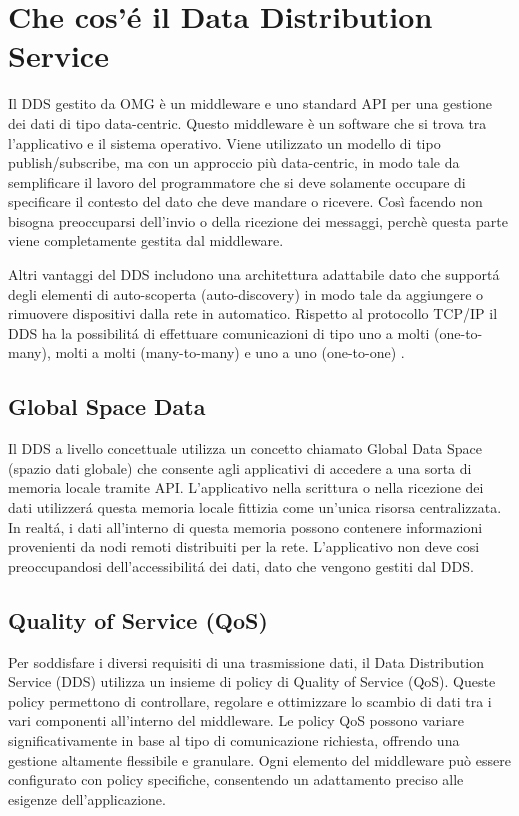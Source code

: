 \section{Che cos'é il Data Distribution Service}

Il DDS gestito da OMG è un middleware e uno standard API per una gestione
dei dati di tipo data-centric. Questo middleware è un software che si trova
tra l'applicativo e il sistema operativo. Viene utilizzato un modello
di tipo publish/subscribe, ma con un approccio più data-centric, in modo
tale da semplificare il lavoro del programmatore che si deve solamente
occupare di specificare il contesto del dato che deve mandare o ricevere.
Così facendo non bisogna preoccuparsi dell'invio o della ricezione
dei messaggi, perchè questa parte viene completamente gestita dal middleware.

Altri vantaggi del DDS includono una architettura adattabile dato che supportá
degli elementi di auto-scoperta (auto-discovery) in modo tale da aggiungere o 
rimuovere dispositivi dalla rete in automatico. Rispetto al protocollo TCP/IP 
il DDS ha la possibilitá di effettuare comunicazioni di tipo uno a molti 
(one-to-many), molti a molti (many-to-many) e uno a uno (one-to-one)
 \cite{1494965}.

\subsection{Global Space Data}
Il DDS a livello concettuale utilizza un concetto chiamato Global Data 
Space (spazio dati globale) che consente agli applicativi
di accedere a una sorta di memoria locale tramite API.
L'applicativo nella scrittura o nella ricezione dei dati utilizzerá 
questa memoria locale fittizia come un'unica risorsa centralizzata.
In realtá, i dati all'interno di questa memoria possono contenere
informazioni provenienti da nodi remoti distribuiti per la rete. 
L'applicativo non deve cosi preoccupandosi dell'accessibilitá dei dati,
dato che vengono gestiti dal DDS.\cite{whatisdds}

\subsection{Quality of Service (QoS)}

Per soddisfare i diversi requisiti di una trasmissione dati, 
il Data Distribution Service (DDS) utilizza un insieme di policy di 
Quality of Service (QoS). Queste policy permettono di controllare, 
regolare e ottimizzare lo scambio di dati tra i vari componenti 
all'interno del middleware. Le policy QoS possono variare 
significativamente in base al tipo di comunicazione richiesta, 
offrendo una gestione altamente flessibile e granulare. 
Ogni elemento del middleware può essere configurato 
con policy specifiche, consentendo un adattamento preciso alle 
esigenze dell'applicazione.


